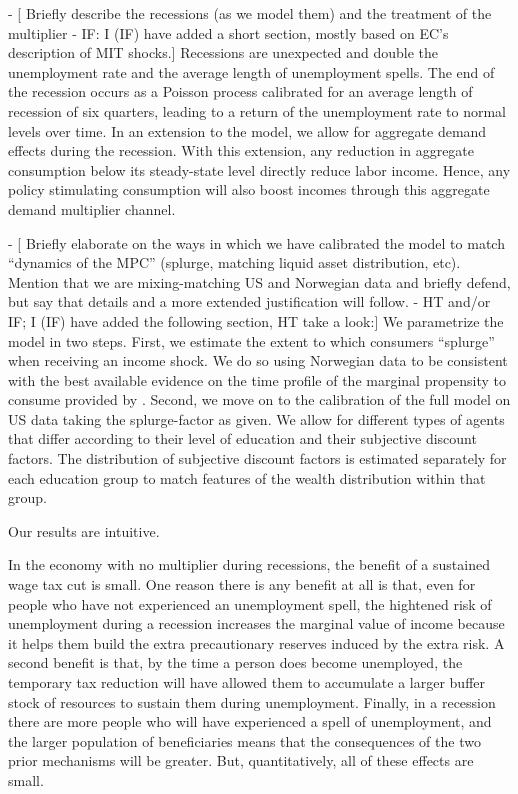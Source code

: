 \documentclass[../HAFiscal]{subfiles}
\begin{document}
- [ Briefly describe the recessions (as we model them) and the treatment of the multiplier - IF: I (IF) have added a short section, mostly based on EC's description of MIT shocks.]
Recessions are unexpected and double the unemployment rate and the average length of unemployment spells. The end of the recession occurs as a Poisson process calibrated for an average length of recession of six quarters, leading to a return of the unemployment rate to normal levels over time. In an extension to the model, we allow for aggregate demand effects during the recession. With this extension, any reduction in aggregate consumption below its steady-state level directly reduce labor income. Hence, any policy stimulating consumption will also boost incomes through this aggregate demand multiplier channel.

- [ Briefly elaborate on the ways in which we have calibrated the model to match ``dynamics of the MPC'' (splurge, matching liquid asset distribution, etc).  Mention that we are mixing-matching US and Norwegian data and briefly defend, but say that details and a more extended justification will follow. - HT and/or IF; I (IF) have added the following section, HT take a look:]
We parametrize the model in two steps. First, we estimate the extent to which consumers ``splurge'' when receiving an income shock. We do so using Norwegian data to be consistent with the best available evidence on the time profile of the marginal propensity to consume provided by \citet{fagereng_mpc_2021}. Second, we move on to the calibration of the full model on US data taking the splurge-factor as given. We allow for different types of agents that differ according to their level of education and their subjective discount factors. The distribution of subjective discount factors is estimated separately for each education group to match features of the wealth distribution within that group. 


Our results are intuitive.

In the economy with no multiplier during recessions, the benefit of a sustained wage tax cut is small.  One reason there is any benefit at all is that, even for people who have not experienced an unemployment spell, the hightened risk of unemployment during a recession increases the marginal value of income because it helps them build the extra precautionary reserves induced by the extra risk.  A second benefit is that, by the time a person does become unemployed, the temporary tax reduction will have allowed them to accumulate a larger buffer stock of resources to sustain them during unemployment.  Finally, in a recession there are more people who will have experienced a spell of unemployment, and the larger population of beneficiaries means that the consequences of the two prior mechanisms will be greater.  But, quantitatively, all of these effects are small.
\end{document}
